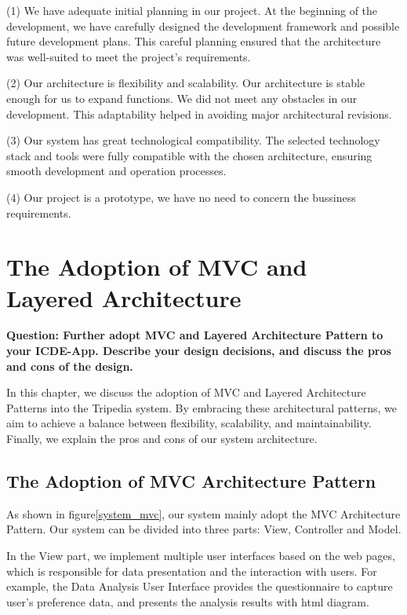 \documentclass[conference]{IEEEtran}
\begin{document}
(1) We have adequate initial planning in our project. At the beginning of the development, we have carefully designed the development framework and possible future development plans. This careful planning ensured that the architecture was well-suited to meet the project's requirements.

(2) Our architecture is flexibility and scalability. Our architecture is stable enough for us to expand functions. We did not meet any obstacles in our development. This adaptability helped in avoiding major architectural revisions.

(3) Our system has great technological compatibility. The selected technology stack and tools were fully compatible with the chosen architecture, ensuring smooth development and operation processes.

(4) Our project is a prototype, we have no need to concern the bussiness requirements. 


\section{\textbf{The Adoption of MVC and Layered Architecture}}

\textbf{Question: Further adopt MVC and Layered Architecture Pattern to your ICDE-App. Describe your design decisions, and discuss the pros and cons of the design.}

In this chapter, we discuss the adoption of MVC and Layered Architecture Patterns into the Tripedia system. By embracing these architectural patterns, we aim to achieve a balance between flexibility, scalability, and maintainability. Finally, we explain the pros and cons of our system architecture.


\subsection{\textbf{The Adoption of MVC Architecture Pattern}}

As shown in figure\ref{system_mvc}, our system mainly adopt the MVC Architecture Pattern. Our system can be divided into three parts: View, Controller and Model.

In the View part, we implement multiple user interfaces based on the web pages, which is responsible for data presentation and the interaction with users. For example, the Data Analysis User Interface provides the questionnaire to capture user's preference data, and presents the analysis results with html diagram.
\end{document}

